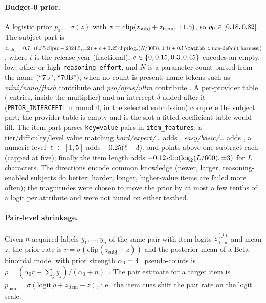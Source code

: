 \documentclass{article}
\begin{document}
\paragraph{Budget-0 prior.}
A logistic prior $p_0=\sigma(z)$ with $z=\mathrm{clip}(z_{\mathrm{subj}}+z_{\mathrm{item}},\pm1.5)$, so $p_0\in[0.18,0.82]$. The subject part is $z_{\mathrm{subj}}=\CSubjectShrink\cdot(\CYearSlope\,\mathrm{clip}(t-2024.5,\pm2) + e + \CSizeSlope\,\mathrm{clip}(\log_2(N/30\mathrm{B}),\pm4) + \CHarness\,\mathbb 1[\text{non-default harness}])$, where $t$ is the release year (fractional), $e\in\{0,0.15,0.3,0.45\}$ encodes an empty, low, other or high \texttt{reasoning\_effort}, and $N$ is a parameter count parsed from the name (``7b'', ``70B''); when no count is present, name tokens such as \emph{mini/nano/flash} contribute \CSmallName{} and \emph{pro/opus/ultra} contribute \CLargeName. A per-provider table (\CNProvider{} entries, inside the multiplier) and an intercept $\delta$ added after it (\texttt{PRIOR\_INTERCEPT}: \ShipIntercept{} in round 4, \SelIntercept{} in the selected submission) complete the subject part; the provider table is empty and is the slot a fitted coefficient table would fill. The item part parses \texttt{key=value} pairs in \texttt{item\_features}: a tier/difficulty/level value matching \emph{hard/expert/\dots} adds \CTierHard, \emph{easy/basic/\dots} adds \CTierEasy, a numeric level $\ell\in[1,5]$ adds $-0.25(\ell-3)$, and points above one subtract \CPoints{} each (capped at five); finally the item length adds $-0.12\,\mathrm{clip}(\log_2(L/600),\pm3)$ for $L$ characters. The directions encode common knowledge (newer, larger, reasoning-enabled subjects do better; harder, longer, higher-value items are failed more often); the magnitudes were chosen to move the prior by at most a few tenths of a logit per attribute and were not tuned on either testbed.

\paragraph{Pair-level shrinkage.}
Given $n$ acquired labels $y_1,\dots,y_n$ of the same pair with item logits $z_{\mathrm{item}}^{(j)}$ and mean $\bar z$, the prior rate is $r=\sigma(\mathrm{clip}(z_{\mathrm{subj}}+\bar z))$ and the posterior mean of a Beta--binomial model with prior strength $\alpha_0=4^\dagger$ pseudo-counts is $\rho=(\alpha_0 r+\sum_j y_j)/(\alpha_0+n)$~\citep{efron1975}. The pair estimate for a target item is $p_{\mathrm{pair}}=\sigma(\mathrm{logit}\,\rho + z_{\mathrm{item}}-\bar z)$, i.e.\ the item cues shift the pair rate on the logit scale.
\end{document}
